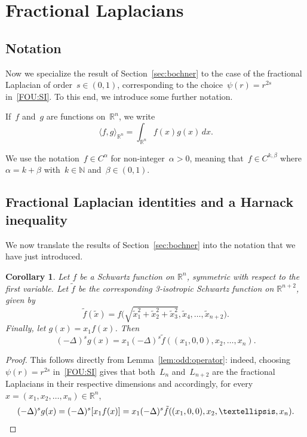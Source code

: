 \documentclass[a4paper,12pt,reqno]{amsart}
\numberwithin{equation}{section}
\newtheorem{corollary}[theorem]{Corollary}
\theoremstyle{definition}
\theoremstyle{notation}
\newcommand{\R}{\mathds{R}}
\newcommand{\N}{\mathds{N}}
\begin{document}
%
%


\section{Fractional Laplacians}
\label{sec:flap}


\subsection{Notation}\label{sec:notation}
Now we
specialize the result of Section~\ref{sec:bochner}
to the case of the fractional Laplacian of order~$s\in(0,1)$, corresponding to the choice~$\psi(r) = r^{2 s}$ in~\eqref{FOU:SI}. To this end, we introduce some further notation.


If~$f$ and~$g$ are functions on~$\R^n$, we write
$$ \langle f,g\rangle_{\R^n}=\int_{\R^n}f(x)g(x)\,dx.$$


We use the notation~$f\in C^\alpha$ for non-integer~$\alpha>0$, meaning
that~$f\in C^{k,\beta}$ where~$\alpha=k+\beta$ with~$k\in\N$ and~$\beta\in(0,1)$.


\subsection{Fractional Laplacian identities and a Harnack inequality}\label{subsec:fl}
We now translate the results of Section~\ref{sec:bochner} into the notation that we have just introduced.


\begin{corollary}
\label{cor:odd:flap}
Let $f$ be a %
Schwartz function on $\R^n$, symmetric with respect to the first variable. Let $\tilde{f}$ be the corresponding 3-isotropic Schwartz function on $\R^{n + 2}$, given by
\[
 \tilde{f}(\tilde{x}) = f\bigg (\sqrt{\tilde{x}_1^2 + \tilde{x}_2^2 + \tilde{x}_3^2}, \tilde{x}_4, \ldots, \tilde{x}_{n + 2} \bigg ) .
\]
Finally, let $g(x) = x_1 f(x)$. Then
\[
 (-\Delta)^s g(x) = x_1 (-\Delta)^s \tilde{f}((x_1, 0, 0), x_2, \ldots, x_n) .
\]
\end{corollary}


\begin{proof} This follows directly from Lemma~\ref{lem:odd:operator}: indeed,
choosing~$\psi(r) = r^{2 s}$ in~\eqref{FOU:SI} gives that 
both~$ L_n$ and~$ L_{n+2}$ are the fractional Laplacians in their respective dimensions
and accordingly, for every~$x=(x_1,x_2,\dots,x_n)\in\R^n$,
\begin{equation*}
(-\Delta)^sg(x)=(-\Delta)^s[x_1 f(x)]=x_1(-\Delta)^s
\tilde f((x_1,0,0),x_2,\dots,x_n)%
.\qedhere
\end{equation*}
\end{proof}
\end{document}
